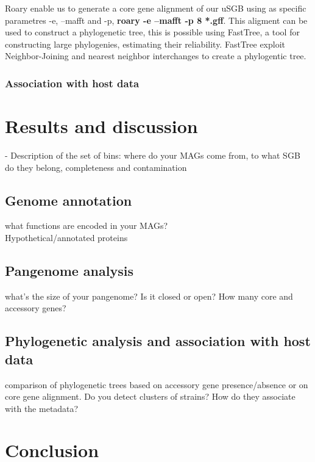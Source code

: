 \documentclass[a4paper,titlepage]{book}
\begin{document}
Roary enable us to generate a core gene alignment of our uSGB using as specific parametres -e, --mafft and -p, \textbf{roary -e --mafft -p 8 *.gff}. This aligment can be used to construct a phylogenetic tree, this is possible using FastTree, a tool for constructing large phylogenies, estimating their reliability.
FastTree exploit Neighbor-Joining and nearest neighbor interchanges to create a phylogentic tree. \cite{FastTree}

\subsection{Association with host data}

\chapter{Results and discussion}
- Description of the set of bins: where do your MAGs come from, to what SGB do they belong, completeness and contamination
\section{Genome annotation}
what functions are encoded in your MAGs?
\\Hypothetical/annotated proteins
\section{Pangenome analysis}
 what’s the size of your pangenome? Is it closed or open? How many core and accessory genes?
\section{Phylogenetic analysis and association with host data}
comparison of phylogenetic trees based on accessory gene presence/absence or on core gene alignment. Do you detect clusters of strains? How do they associate with the metadata?

\chapter{Conclusion}
\end{document}
